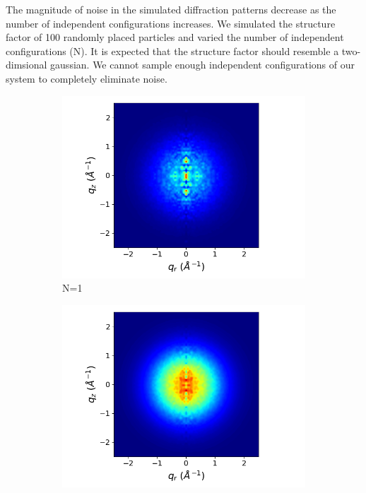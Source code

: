 \documentclass[journal=jpcbfk,manusciprt=article]{achemso}
\begin{document}
  The magnitude of noise in the simulated diffraction patterns decrease as 
  the number of independent configurations increases. We simulated the structure
  factor of 100 randomly placed particles and varied the number of independent 
  configurations (N). It is expected that the structure factor should resemble
  a two-dimsional gaussian. We cannot sample enough independent configurations
  of our system to completely eliminate noise.
  
  \begin{figure}[!htb]
  \centering
  \begin{subfigure}{0.45\linewidth}
  \centering
  \includegraphics[width=\textwidth]{xrd_1frame.png}
  \caption{N=1}
  \end{subfigure}
  \begin{subfigure}{0.45\linewidth}
  \centering
  \includegraphics[width=\textwidth]{xrd_10frame.png}

\end{subfigure}
\end{figure}
\end{document}
